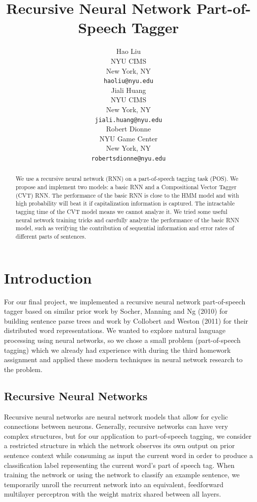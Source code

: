 \documentclass[11pt]{article}
\title{Recursive Neural Network Part-of-Speech Tagger}
\author{Hao Liu \\
  NYU CIMS \\
  New York, NY \\
  {\tt haoliu@nyu.edu} \\\And
  Jiali Huang \\
  NYU CIMS \\
  New York, NY \\
  {\tt jiali.huang@nyu.edu} \\\And
  Robert Dionne \\
  NYU Game Center \\
  New York, NY \\
  {\tt robertsdionne@nyu.edu} \\}
\date{}
\begin{document}
\maketitle
\begin{abstract}
We use a recursive neural network (RNN) on a part-of-speech tagging task (POS). We propose and implement two models: a basic RNN and a Compositional Vector Tagger (CVT) RNN. The performance of the basic RNN is close to the HMM model and with high probability will beat it if capitalization information is captured. The intractable tagging time of the CVT model means we cannot analyze it. We tried some useful neural network training tricks and carefully analyze the performance of the basic RNN model, such as verifying the contribution of sequential information and error rates of different parts of sentences.
\end{abstract}

\section{Introduction}

For our final project, we implemented a recursive neural network part-of-speech tagger based on similar prior work by Socher, Manning and Ng (2010) for building sentence parse trees and work by Collobert and Weston (2011) for their distributed word representations. We wanted to explore natural language processing using neural networks, so we chose a small problem (part-of-speech tagging) which we already had experience with during the third homework assignment and applied these modern techniques in neural network research to the problem.

\subsection{Recursive Neural Networks}

Recursive neural networks are neural network models that allow for cyclic connections between neurons. Generally, recursive networks can have very complex structures, but for our application to part-of-speech tagging, we consider a restricted structure in which the network observes its own output on prior sentence context while consuming as input the current word in order to produce a classification label representing the current word's part of speech tag. When training the network or using the network to classify an example sentence, we temporarily unroll the recurrent network into an equivalent, feedforward multilayer perceptron with the weight matrix shared between all layers.
\end{document}
